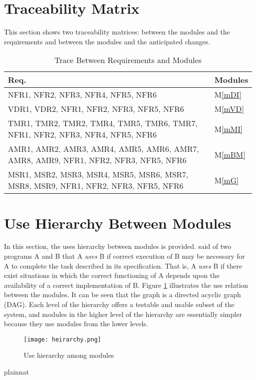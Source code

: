 \documentclass[12pt, titlepage]{article}
\newcommand{\mref}[1]{M\ref{#1}}
\begin{document}
\section{Traceability Matrix} \label{SecTM}

This section shows two traceability matrices: between the modules and the
requirements and between the modules and the anticipated changes.

\begin{table}[H]
\centering
\begin{tabular}{p{} p{}}
\toprule
\textbf{Req.} & \textbf{Modules}\\
\midrule
NFR1, NFR2, NFR3, NFR4, NFR5, NFR6 & \mref{mDI}\\
\midrule
VDR1, VDR2, NFR1, NFR2, NFR3, NFR5, NFR6 & \mref{mVD}\\
\midrule
TMR1, TMR2, TMR2, TMR4, TMR5, TMR6, TMR7, NFR1, NFR2, NFR3, NFR4, NFR5, NFR6 & \mref{mMI}\\
\midrule
AMR1, AMR2, AMR3, AMR4, AMR5, AMR6, AMR7, AMR8, AMR9, NFR1, NFR2, NFR3, NFR5, NFR6 & \mref{mBM} \\
\midrule
MSR1, MSR2, MSR3, MSR4, MSR5, MSR6, MSR7, MSR8, MSR9, NFR1, NFR2, NFR3, NFR5, NFR6 & \mref{mG} \\
\bottomrule
\end{tabular}
\caption{Trace Between Requirements and Modules}
\label{TblRT}
\end{table}

\section{Use Hierarchy Between Modules} \label{SecUse}

In this section, the uses hierarchy between modules is
provided. \citet{Parnas1978} said of two programs A and B that A {\em uses} B if
correct execution of B may be necessary for A to complete the task described in
its specification. That is, A {\em uses} B if there exist situations in which
the correct functioning of A depends upon the availability of a correct
implementation of B.  Figure \ref{FigUH} illustrates the use relation between
the modules. It can be seen that the graph is a directed acyclic graph
(DAG). Each level of the hierarchy offers a testable and usable subset of the
system, and modules in the higher level of the hierarchy are essentially simpler
because they use modules from the lower levels.

\begin{figure}[H]
\centering
\texttt{[image: heirarchy.png]}
\caption{Use hierarchy among modules}
\label{FigUH}
\end{figure}


 {plainnat}


\newpage{}
\end{document}
